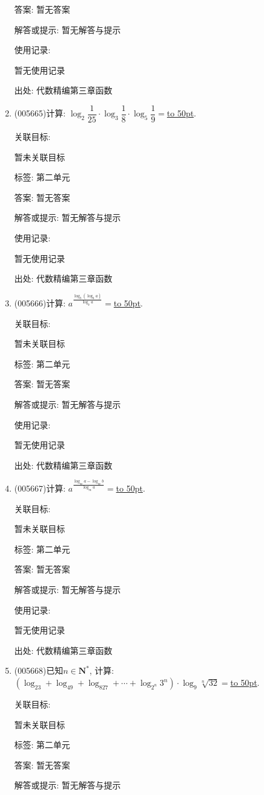 \documentclass[10pt,a4paper]{article}
\newcommand{\blank}[1]{\underline{\hbox to #1pt{}}}
\begin{document}
\begin{enumerate}[1.]
答案: 暂无答案

解答或提示: 暂无解答与提示

使用记录:

暂无使用记录


出处: 代数精编第三章函数
\item { (005665)}计算: $\log_2\dfrac 1{25}\cdot \log_3\dfrac 18\cdot \log_5\dfrac 19=$\blank{50}.


关联目标:

暂未关联目标



标签: 第二单元

答案: 暂无答案

解答或提示: 暂无解答与提示

使用记录:

暂无使用记录


出处: 代数精编第三章函数
\item { (005666)}计算: $a^{\frac{\log_b(\log_ba)}{\log_ba}}=$\blank{50}.


关联目标:

暂未关联目标



标签: 第二单元

答案: 暂无答案

解答或提示: 暂无解答与提示

使用记录:

暂无使用记录


出处: 代数精编第三章函数
\item { (005667)}计算: $a^{\frac{\log_ma-\log_mb}{\log_ma}}=$\blank{50}.


关联目标:

暂未关联目标



标签: 第二单元

答案: 暂无答案

解答或提示: 暂无解答与提示

使用记录:

暂无使用记录


出处: 代数精编第三章函数
\item { (005668)}已知$n\in \mathbf{N}^*$, 计算: $(\log_23+\log_49+\log_827+\cdots +\log_{2^n}3^n)\cdot \log_9\sqrt [n]{32}=$\blank{50}.


关联目标:

暂未关联目标



标签: 第二单元

答案: 暂无答案

解答或提示: 暂无解答与提示


\end{enumerate}
\end{document}
